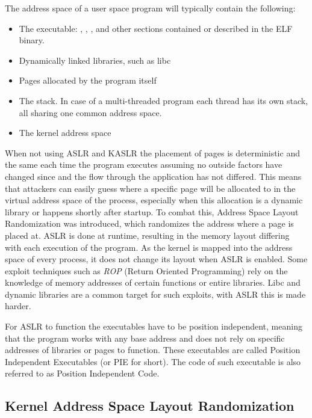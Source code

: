 The address space of a user space program will typically contain the following:

\begin{itemize}
  \item The executable: , , ,  and other sections contained or described in the ELF binary.
  \item Dynamically linked libraries, such as libc
  \item Pages allocated by the program itself
  \item The stack. In case of a multi-threaded program each thread has its own stack, all sharing one common address space.
  \item The kernel address space
\end{itemize}

When not using ASLR and KASLR the placement of pages is deterministic and the same each time the program executes assuming no outside factors have changed since and the flow through the application has not differed.
This means that attackers can easily guess where a specific page will be allocated to in the virtual address space of the process, especially when this allocation is a dynamic library or happens shortly after startup.
To combat this, Address Space Layout Randomization was introduced, which randomizes the address where a page is placed at.
ASLR is done at runtime, resulting in the memory layout differing with each execution of the program.
As the kernel is mapped into the address space of every process, it does not change its layout when ASLR is enabled.
Some exploit techniques such as \textit{ROP} (Return Oriented Programming) rely on the knowledge of memory addresses of certain functions or entire libraries.
Libc and dynamic libraries are a common target for such exploits, with ASLR this is made harder.\cite{pie}

For ASLR to function the executables have to be position independent, meaning that the program works with any base address and does not rely on specific addresses of libraries or pages to function.
These executables are called Position Independent Executables (or PIE for short).
The code of such executable is also referred to as Position Independent Code.\cite{pie}

\subsection{Kernel Address Space Layout Randomization}

